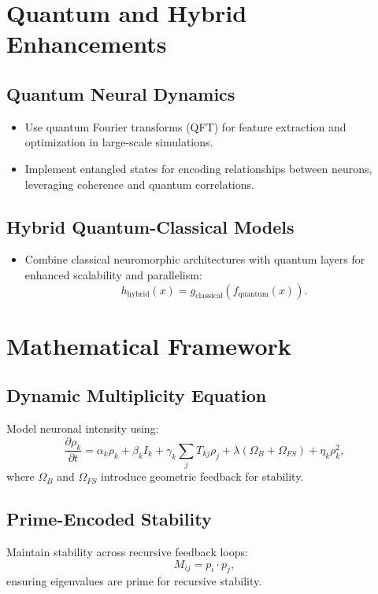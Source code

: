 \documentclass{article}
\theoremstyle{plain}
\begin{document}
\section{Quantum and Hybrid Enhancements}

\subsection{Quantum Neural Dynamics}
\begin{itemize}
    \item Use quantum Fourier transforms (QFT) for feature extraction and optimization in large-scale simulations.
    \item Implement entangled states for encoding relationships between neurons, leveraging coherence and quantum correlations.
\end{itemize}

\subsection{Hybrid Quantum-Classical Models}
\begin{itemize}
    \item Combine classical neuromorphic architectures with quantum layers for enhanced scalability and parallelism:
    \[
    h_{\text{hybrid}}(x) = g_{\text{classical}}(f_{\text{quantum}}(x)).
    \]
\end{itemize}

\section{Mathematical Framework}

\subsection{Dynamic Multiplicity Equation}
Model neuronal intensity using:
\[
\frac{\partial \rho_k}{\partial t} = \alpha_k \rho_k + \beta_k I_k + \gamma_k \sum_j T_{kj}\rho_j + \lambda(\Omega_B + \Omega_{FS}) + \eta_k \rho_k^2,
\]
where \(\Omega_B\) and \(\Omega_{FS}\) introduce geometric feedback for stability.

\subsection{Prime-Encoded Stability}
Maintain stability across recursive feedback loops:
\[
M_{ij} = p_i \cdot p_j,
\]
ensuring eigenvalues are prime for recursive stability.
\end{document}
